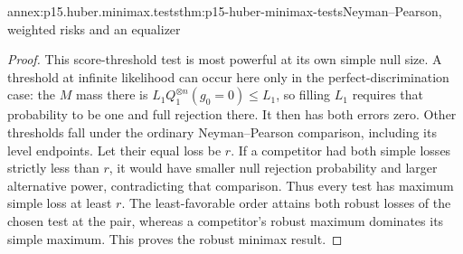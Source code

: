 \begin{annexitem}{annex:p15.huber.minimax.tests}{thm:p15-huber-minimax-tests}{Neyman--Pearson, weighted risks and an equalizer}
\begin{proof}
This score-threshold test is most powerful at its own simple null
size. A threshold at infinite likelihood can occur here only in
the perfect-discrimination case: the \(M\) mass there is
\(L_1Q_1^{\otimes n}(g_0=0)\leq L_1\), so filling \(L_1\)
requires that probability to be one and full rejection there.
It then has both errors zero. Other thresholds fall under the
ordinary Neyman--Pearson comparison, including its level endpoints.
Let their equal loss be \(r\). If a competitor had both simple losses
strictly less than \(r\), it would have smaller null rejection
probability and larger alternative power, contradicting that comparison.
Thus every test has maximum simple loss at least \(r\).
The least-favorable order attains both robust losses of the chosen
test at the pair, whereas a competitor's robust maximum dominates
its simple maximum. This proves the robust minimax result.
\end{proof}
\end{annexitem}

